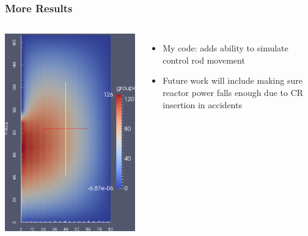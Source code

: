 \begin{frame}
    \frametitle{More Results}
    \begin{columns}
        \column{5cm}
    \includegraphics[height=\textheight]{rodded}

    \column{5cm}

    \begin{itemize}
        \item My code: adds ability to simulate control rod movement
        \item Future work will include making sure reactor power falls enough due to CR insertion in accidents
           \end{itemize}

\end{columns}

\end{frame}
